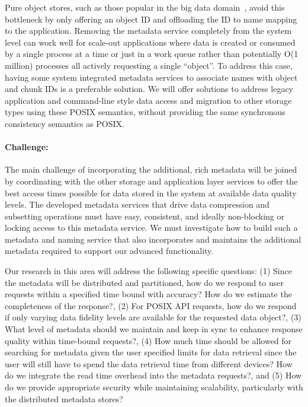 Pure object stores, such as those popular in the big data
domain~\cite{Fitzpatrick:2004:memcached}, avoid this bottleneck by only
offering an object ID and offloading the ID to name mapping to the application.
Removing the metadata service completely from the system level can work well
for scale-out applications where data is created or consumed by a single
process at a time or just in a work queue rather than potentially O(1 million)
processes all actively requesting a single ``object''. To address this case,
having some system integrated metadata services to associate names with object
and chunk IDs is a preferable solution. We will offer solutions to address
legacy application and command-line style data access and migration to other
storage types using these POSIX semantics, without providing the same
synchronous consistency semantics as POSIX.

\paragraph{Challenge:}
The main challenge of incorporating the additional, rich metadata will be
joined by coordinating with the other storage and
application layer services to offer the best access times possible for data
stored in the system at available data quality levels. The developed metadata
services that drive data compression and subsetting operations must have easy,
consistent, and ideally non-blocking or locking access to this metadata
service. We must investigate how to build such a metadata and naming service
that also incorporates and maintains the additional metadata required to
support our advanced functionality.

Our research in this area will address the following specific questions:
(1) Since the metadata will be distributed and partitioned, how do we respond
to user requests within a specified time bound with accuracy? How do we
estimate the completeness of the response?, 
(2) For POSIX API requests, how do we respond if only varying data fidelity
levels are available for the requested data object?, 
(3) What level of metadata should we maintain and keep in sync to enhance
response quality within time-bound requests?, 
(4) How much time should be allowed for searching for metadata given the user
specified limits for data retrieval since the user will still have to spend the
data retrieval time from different devices? How do we integrate the read time
overhead into the metadata requests?, and
(5) How do we provide appropriate security while maintaining scalability,
particularly with the distributed metadata stores?

